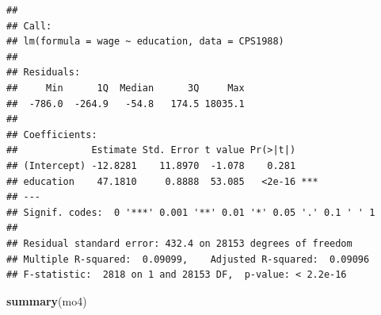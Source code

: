 \documentclass[
]{book}
\newenvironment{Shaded}{\begin{snugshade}}{\end{snugshade}}
\newcommand{\DataTypeTok}[1]{\textcolor[rgb]{0.13,0.29,0.53}{#1}}
\newcommand{\DecValTok}[1]{\textcolor[rgb]{0.00,0.00,0.81}{#1}}
\newcommand{\KeywordTok}[1]{\textcolor[rgb]{0.13,0.29,0.53}{\textbf{#1}}}
\newcommand{\NormalTok}[1]{#1}
\newcommand{\OperatorTok}[1]{\textcolor[rgb]{0.81,0.36,0.00}{\textbf{#1}}}
\newcommand{\StringTok}[1]{\textcolor[rgb]{0.31,0.60,0.02}{#1}}
\begin{document}
\begin{Shaded}
\end{Shaded}

\begin{verbatim}
## 
## Call:
## lm(formula = wage ~ education, data = CPS1988)
## 
## Residuals:
##     Min      1Q  Median      3Q     Max 
##  -786.0  -264.9   -54.8   174.5 18035.1 
## 
## Coefficients:
##             Estimate Std. Error t value Pr(>|t|)    
## (Intercept) -12.8281    11.8970  -1.078    0.281    
## education    47.1810     0.8888  53.085   <2e-16 ***
## ---
## Signif. codes:  0 '***' 0.001 '**' 0.01 '*' 0.05 '.' 0.1 ' ' 1
## 
## Residual standard error: 432.4 on 28153 degrees of freedom
## Multiple R-squared:  0.09099,    Adjusted R-squared:  0.09096 
## F-statistic:  2818 on 1 and 28153 DF,  p-value: < 2.2e-16
\end{verbatim}

\begin{Shaded}
\begin{Highlighting}[]
\KeywordTok{summary}\NormalTok{(mo4)}
\end{Highlighting}
\end{Shaded}
\end{document}
